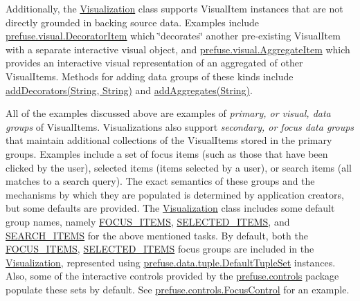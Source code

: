 \-Additionally, the \hyperlink{classprefuse_1_1_visualization}{\-Visualization} class supports \-Visual\-Item instances that are not directly grounded in backing source data. \-Examples include \hyperlink{}{prefuse.\-visual.\-Decorator\-Item} which \char`\"{}decorates\char`\"{} another pre-\/existing \-Visual\-Item with a separate interactive visual object, and \hyperlink{}{prefuse.\-visual.\-Aggregate\-Item} which provides an interactive visual representation of an aggregated of other \-Visual\-Items. \-Methods for adding data groups of these kinds include \hyperlink{classprefuse_1_1_visualization_a147dc277b6158e0722d762023b4c4fe9}{add\-Decorators(\-String, String)} and \hyperlink{classprefuse_1_1_visualization_ac3b5a19eab9b7d7a526240f0098f939b}{add\-Aggregates(\-String)}.

\-All of the examples discussed above are examples of {\itshape primary, or visual, data groups\/} of \-Visual\-Items. \-Visualizations also support {\itshape secondary, or focus data groups\/} that maintain additional collections of the \-Visual\-Items stored in the primary groups. \-Examples include a set of focus items (such as those that have been clicked by the user), selected items (items selected by a user), or search items (all matches to a search query). \-The exact semantics of these groups and the mechanisms by which they are populated is determined by application creators, but some defaults are provided. \-The \hyperlink{classprefuse_1_1_visualization}{\-Visualization} class includes some default group names, namely \hyperlink{classprefuse_1_1_visualization_af0008fce03c57f8b98e3b697f4134ded}{\-F\-O\-C\-U\-S\-\_\-\-I\-T\-E\-M\-S}, \hyperlink{classprefuse_1_1_visualization_ad3377de1360bcd1a227089406578b922}{\-S\-E\-L\-E\-C\-T\-E\-D\-\_\-\-I\-T\-E\-M\-S}, and \hyperlink{classprefuse_1_1_visualization_a323513dc089f3642f95b17ddf6da3881}{\-S\-E\-A\-R\-C\-H\-\_\-\-I\-T\-E\-M\-S} for the above mentioned tasks. \-By default, both the \hyperlink{classprefuse_1_1_visualization_af0008fce03c57f8b98e3b697f4134ded}{\-F\-O\-C\-U\-S\-\_\-\-I\-T\-E\-M\-S}, \hyperlink{classprefuse_1_1_visualization_ad3377de1360bcd1a227089406578b922}{\-S\-E\-L\-E\-C\-T\-E\-D\-\_\-\-I\-T\-E\-M\-S} focus groups are included in the \hyperlink{classprefuse_1_1_visualization}{\-Visualization}, represented using \hyperlink{}{prefuse.\-data.\-tuple.\-Default\-Tuple\-Set} instances. \-Also, some of the interactive controls provided by the \hyperlink{}{prefuse.\-controls} package populate these sets by default. \-See \hyperlink{}{prefuse.\-controls.\-Focus\-Control} for an example.

